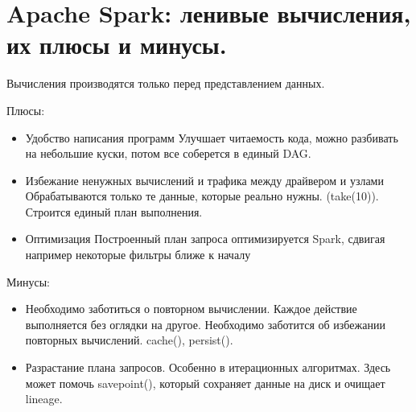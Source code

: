 \section{Apache Spark: ленивые вычисления, их плюсы и минусы.}

Вычисления производятся только перед представлением данных.

Плюсы:
\begin{itemize}
    \item Удобство написания программ
    Улучшает читаемость кода, можно разбивать на небольшие 
    куски, потом все соберется в единый DAG.
    \item Избежание ненужных вычислений и трафика между драйвером и 
    узлами
    Обрабатываются только те данные, которые реально нужны. 
    (take(10)). Строится единый план выполнения.
    \item Оптимизация
    Построенный план запроса оптимизируется Spark, сдвигая 
    например некоторые фильтры ближе к началу
\end{itemize}

Минусы:
\begin{itemize}
    \item Необходимо заботиться о повторном вычислении.
    Каждое действие выполняется без оглядки на другое. 
    Необходимо заботится об избежании повторных вычислений. 
    cache(), persist().
    \item Разрастание плана запросов.
    Особенно в итерационных алгоритмах. Здесь может помочь 
    savepoint(), который сохраняет данные на диск и очищает lineage.
\end{itemize}
